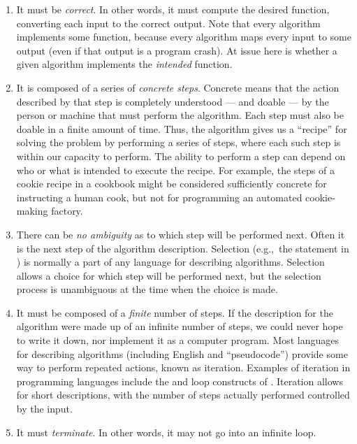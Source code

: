 \begin{enumerate}

\item
It must be \emph{correct}.
In other words, it must compute the desired function, converting each
input to the correct output.
Note that every algorithm implements some function,
because every algorithm maps every input to some output (even if that
output is a program crash).
At issue here is whether a given algorithm implements the 
\emph{intended} function.

\item
It is composed of a series of \emph{concrete steps}.
Concrete means that the action described by that step is
completely understood --- and doable --- by the person or machine that
must perform the algorithm.
Each step must also be doable in a finite amount of time.
Thus, the algorithm gives us a ``recipe'' for solving the problem by
performing a series of steps, where each such step is within our
capacity to perform.
The ability to perform a step can depend on who or what is intended to 
execute the recipe.
For example, the steps of a cookie recipe in a cookbook might be
considered sufficiently concrete for instructing a human cook,
but not for programming an automated cookie-making factory.

\item
There can be \emph{no ambiguity} as to which step will be performed
next.
Often it is the next step of the algorithm description.
Selection (e.g.,~the  statement in \Lang)
is normally a part of any language for describing algorithms.
Selection allows a choice for which step will be
performed next, but the selection process is unambiguous at the time
when the choice is made.

\item
It must be composed of a \emph{finite} number of steps.
If the description for the algorithm were made up of an infinite
number of steps, we could never hope to write it down, nor implement
it as a computer program.
Most languages for describing algorithms (including English
and ``pseudocode'') provide some way to perform
repeated actions, known as iteration.
Examples of iteration in programming languages include the
 and  loop constructs of \Lang.
Iteration allows for short descriptions, with the number of
steps actually performed controlled by the input.

\item
It must \emph{terminate}.
In other words, it may not go into an infinite
loop.

\end{enumerate}


